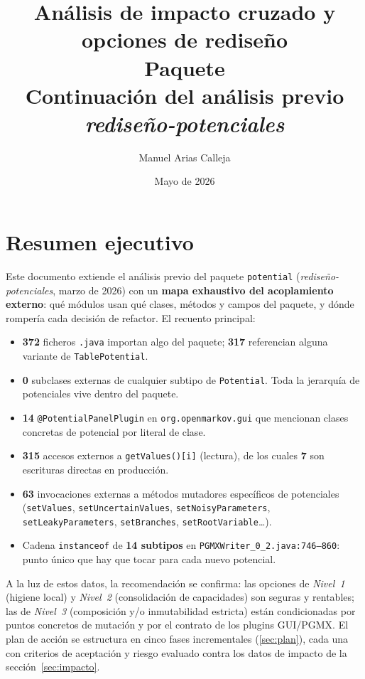 \documentclass[11pt,a4paper]{article}
\title{Análisis de impacto cruzado y opciones de rediseño\\
       \large Paquete \code{org.openmarkov.core.model.network.potential}\\[4pt]
       \normalsize Continuación del análisis previo \emph{rediseño-potenciales}}
\author{Manuel Arias Calleja}
\date{Mayo de 2026}
\newcommand{\code}[1]{\texttt{#1}}
\begin{document}
\maketitle
\tableofcontents
\newpage

\section*{Resumen ejecutivo}

Este documento extiende el análisis previo del paquete \code{potential}
(\emph{rediseño-potenciales}, marzo de 2026) con un \textbf{mapa exhaustivo del
acoplamiento externo}: qué módulos usan qué clases, métodos y campos del
paquete, y dónde rompería cada decisión de refactor. El recuento principal:

\begin{itemize}[leftmargin=*]
  \item \textbf{372} ficheros \code{.java} importan algo del paquete; \textbf{317}
        referencian alguna variante de \code{TablePotential}.
  \item \textbf{0} subclases externas de cualquier subtipo de \code{Potential}.
        Toda la jerarquía de potenciales vive dentro del paquete.
  \item \textbf{14} \code{@PotentialPanelPlugin} en \code{org.openmarkov.gui}
        que mencionan clases concretas de potencial por literal de clase.
  \item \textbf{315} accesos externos a \code{getValues()[i]} (lectura), de los
        cuales \textbf{7} son escrituras directas en producción.
  \item \textbf{63} invocaciones externas a métodos mutadores específicos de
        potenciales (\code{setValues}, \code{setUncertainValues},
        \code{setNoisyParameters}, \code{setLeakyParameters}, \code{setBranches},
        \code{setRootVariable}\dots).
  \item Cadena \code{instanceof} de \textbf{14 subtipos} en
        \code{PGMXWriter\_0\_2.java:746--860}: punto único que hay que tocar para
        cada nuevo potencial.
\end{itemize}

A la luz de estos datos, la recomendación se confirma: las opciones de
\emph{Nivel~1} (higiene local) y \emph{Nivel~2} (consolidación de capacidades)
son seguras y rentables; las de \emph{Nivel~3} (composición y/o inmutabilidad
estricta) están condicionadas por puntos concretos de mutación y por el
contrato de los plugins GUI/PGMX. El plan de acción se estructura en cinco
fases incrementales (\ref{sec:plan}), cada una con criterios de aceptación y
riesgo evaluado contra los datos de impacto de la sección~\ref{sec:impacto}.
\end{document}
